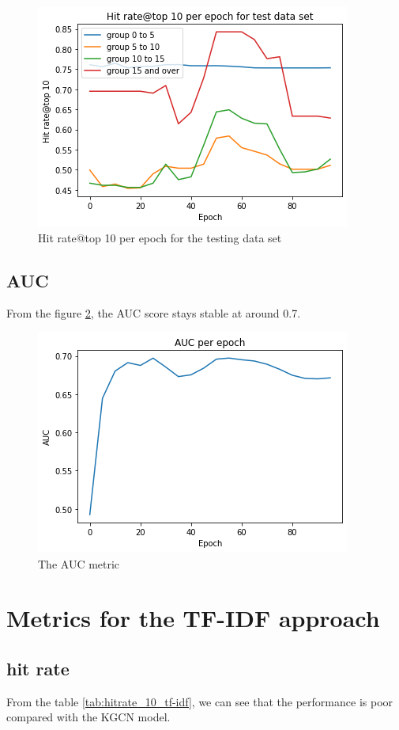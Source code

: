 \documentclass[11pt,twoside]{report}
\begin{document}
\begin{figure}[H]
    \centering
    \includegraphics[scale=0.9]{hitrate@10_test.png}
    \caption{Hit rate@top 10 per epoch for the testing data set}
    \label{fig:hitrate_10_test}
\end{figure}

\subsection{AUC}
From the figure \ref{fig:auc}, the AUC score stays stable at around 0.7.

\begin{figure}[H]
    \centering
    \includegraphics[scale=0.9]{auc.png}
    \caption{The AUC metric}
    \label{fig:auc}
\end{figure}

\section{Metrics for the TF-IDF approach}
\subsection{hit rate}
From the table \ref{tab:hitrate_10_tf-idf}, we can see that the performance is poor compared with the KGCN model.
\end{document}
